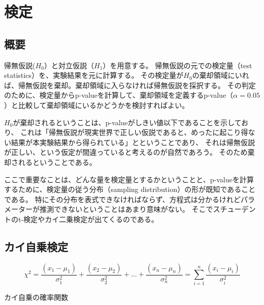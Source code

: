 \chapter{検定}

\section{概要}

帰無仮説($H_0$）と対立仮説（$H_1$）を用意する。
帰無仮説の元での検定量（test statistics）を、実験結果を元に計算する。
その検定量が$H_0$の棄却領域にいれば、帰無仮説を棄却。棄却領域に入らなければ帰無仮説を採択する。
その判定のために、検定量からp-valueを計算して、棄却領域を定義するp-value（$\alpha=0.05$）と比較して棄却領域にいるかどうかを検討すればよい。

$H_0$が棄却されるということは、p-valueがしきい値以下であることを示しており、
これは「帰無仮説が現実世界で正しい仮説であると、めったに起こり得ない結果が本実験結果から得られている」とということであり、
それは帰無仮説が正しい、という仮定が間違っていると考えるのが自然であろう。
そのため棄却されるということである。

ここで重要なことは、どんな量を検定量とするかということと、p-valueを計算するために、検定量の従う分布（sampling distribution）の形が既知であることである。
特にその分布を表式できなければならず、方程式は分かるけれどパラメーターが推測できないということはあまり意味がない。
そこでスチューデントのt-検定やカイ二乗検定が出てくるのである。

\section{カイ自乗検定}

\begin{equation}
  \chi^2 = \frac{(x_1-\mu_1)}{\sigma_1^2} + \frac{(x_2-\mu_2)}{\sigma_2^2} + ... + \frac{(x_n-\mu_n)}{\sigma_n^2} = \sum_{i=1}^{n} \frac{(x_i-\mu_i)}{\sigma_i^2}
\end{equation}

カイ自乗の確率関数

